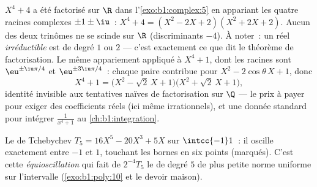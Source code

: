 \begin{example}\label{ex:b1:poly:factorexample}
$X^4 + 4$ a été factorisé sur $\R$ dans l'\cref{exo:b1:complex:5} en
appariant les quatre racines complexes $\pm 1 \pm \iu$~:
$X^4 + 4 = (X^2 - 2X + 2)(X^2 + 2X + 2)$. Aucun des deux trinômes ne
se scinde sur $\R$ (discriminants $-4$). À noter~: un  réel
\emph{irréductible} est de degré $1$ ou $2$ --- c'est exactement ce
que dit le théorème de factorisation. Le même appariement 
appliqué à $X^4 + 1$, dont les racines sont $\eu^{\pm\iu\pi/4}$ et
$\eu^{\pm3\iu\pi/4}$~: chaque paire contribue pour $X^2 -
2\cos\theta\,X + 1$, donc
\[
X^4 + 1 = \bigl(X^2 - \sqrt2\,X + 1\bigr)
\bigl(X^2 + \sqrt2\,X + 1\bigr) ,
\]
identité invisible aux tentatives naïves de factorisation sur $\Q$
--- le prix à payer pour exiger des coefficients réels (ici même
irrationnels), et une donnée standard pour intégrer $\frac1{x^4 +
1}$ au \cref{ch:b1:integration}.
\end{example}

\begin{omfigure}

{\small Le  de Tchebychev $T_5 = 16X^5 - 20X^3 + 5X$ sur
$\intcc{-1}1$~: il oscille exactement entre $-1$ et $1$, touchant
les bornes en six points (marqués). C'est cette
\emph{équioscillation} qui fait de $2^{-4}T_5$ le 
de degré $5$ de plus petite norme uniforme sur l'intervalle
(\cref{exo:b1:poly:10} et le devoir maison).}
\end{omfigure}

